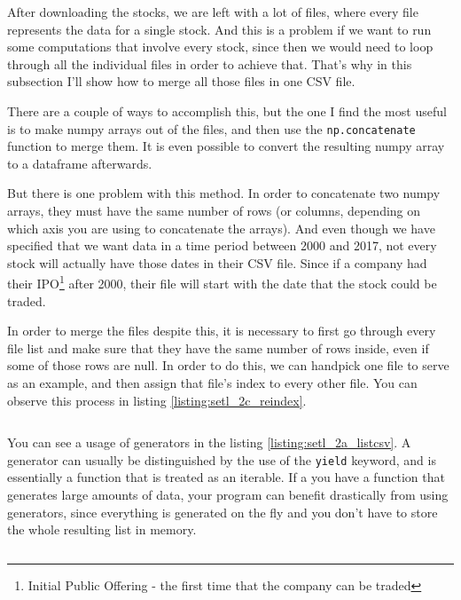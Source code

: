 \documentclass[12pt, a4paper]{article}
\begin{document}
After downloading the stocks, we are left with a lot of files, where every file represents the data for a single stock. And this is a problem if we want to run some computations that involve every stock, since then we would need to loop through all the individual files in order to achieve that. That’s why in this subsection I’ll show how to merge all those files in one CSV file.

There are a couple of ways to accomplish this, but the one I find the most useful is to make numpy\cite{walt2011numpy} arrays out of the files, and then use the \texttt{np.concatenate} function to merge them. It is even possible to convert the resulting numpy array to a dataframe afterwards.

But there is one problem with this method. In order to  concatenate two numpy arrays, they must have the same number of rows (or columns, depending on which axis you are using to concatenate the arrays). And even though we have specified that we want data in a time period between 2000 and 2017, not every stock will actually have those dates in their CSV file. Since if a company had their IPO\footnote{Initial Public Offering - the first time that the company can be traded} after 2000, their file will start with the date that the stock could be traded.

In order to merge the files despite this, it is necessary to first go through every file list and make sure that they have the same number of rows inside, even if some of those rows are null. In order to do this, we can handpick one file to serve as an example, and then assign that file’s index to every other file. You can observe this process in listing \ref{listing:setl_2c_reindex}.

\bgroup
  \inputminted[linenos, breaklines=true, fontsize=\scriptsize, firstnumber=last]{python}{src/stocks/etl/2b_timearr.py}
  \label{listing:setl_2b_timearr}
\egroup

You can see a usage of generators in the listing \ref{listing:setl_2a_listcsv}. A generator can usually be distinguished by the use of the \texttt{yield} keyword, and is essentially a function that is treated as an iterable. If a you have a function that generates large amounts of data, your program can benefit drastically from using generators, since everything is generated on the fly and you don't have to store the whole resulting list in memory.

\bgroup
  \inputminted[linenos, breaklines=true, fontsize=\scriptsize, firstnumber=last]{python}{src/stocks/etl/2a_listcsv.py}
  \label{listing:setl_2a_listcsv}
\egroup
\end{document}
